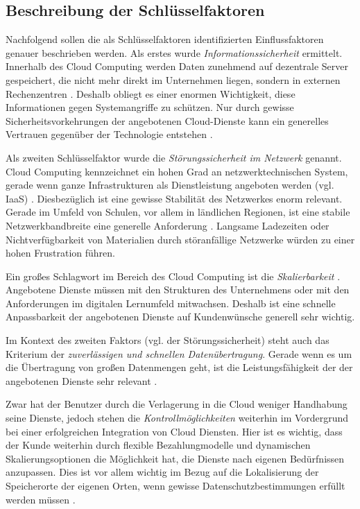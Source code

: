 \subsection{Beschreibung der Schlüsselfaktoren}

Nachfolgend sollen die als Schlüsselfaktoren identifizierten Einflussfaktoren genauer beschrieben werden. Als erstes wurde \textit{Informationssicherheit} ermittelt. Innerhalb des Cloud Computing werden Daten zunehmend auf dezentrale Server gespeichert, die nicht mehr direkt im Unternehmen liegen, sondern in externen Rechenzentren \cite{krcmar}. Deshalb obliegt es einer enormen Wichtigkeit, diese Informationen gegen Systemangriffe zu schützen. Nur durch gewisse Sicherheitsvorkehrungen der angebotenen Cloud-Dienste kann ein generelles Vertrauen gegenüber der Technologie entstehen \cite{gebauer}.

Als zweiten Schlüsselfaktor wurde die \textit{Störungssicherheit im Netzwerk} genannt. Cloud Computing kennzeichnet ein hohen Grad an netzwerktechnischen System, gerade wenn ganze Infrastrukturen als Dienstleistung angeboten werden (vgl. IaaS) \cite{krcmar}. Diesbezüglich ist eine gewisse Stabilität des Netzwerkes enorm relevant. Gerade im Umfeld von Schulen, vor allem in ländlichen Regionen, ist eine stabile Netzwerkbandbreite eine generelle Anforderung \cite{gebauer}. Langsame Ladezeiten oder Nichtverfügbarkeit von Materialien durch störanfällige Netzwerke würden zu einer hohen Frustration führen.

Ein großes Schlagwort im Bereich des Cloud Computing ist die \textit{Skalierbarkeit} \cite{renz}. Angebotene Dienste müssen mit den Strukturen des Unternehmens oder mit den Anforderungen im digitalen Lernumfeld mitwachsen. Deshalb ist eine schnelle Anpassbarkeit der angebotenen Dienste auf Kundenwünsche generell sehr wichtig.

Im Kontext des zweiten Faktors (vgl. der Störungssicherheit) steht auch das Kriterium der \textit{zuverlässigen und schnellen Datenübertragung}. Gerade wenn es um die Übertragung von großen Datenmengen geht, ist die Leistungsfähigkeit der der angebotenen Dienste sehr relevant \cite{gebauer}.

Zwar hat der Benutzer durch die Verlagerung in die Cloud weniger Handhabung seine Dienste, jedoch stehen die \textit{Kontrollmöglichkeiten} weiterhin im Vordergrund bei einer erfolgreichen Integration von Cloud Diensten. Hier ist es wichtig, dass der Kunde weiterhin durch flexible Bezahlungmodelle und dynamischen Skalierungsoptionen die Möglichkeit hat, die Dienste nach eigenen Bedürfnissen anzupassen. Dies ist vor allem wichtig im Bezug auf die Lokalisierung der Speicherorte der eigenen Orten, wenn gewisse Datenschutzbestimmungen erfüllt werden müssen \cite{gebauer}.

